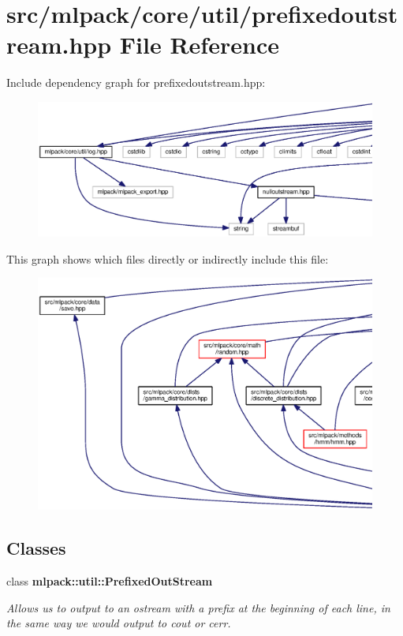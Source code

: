 \section{src/mlpack/core/util/prefixedoutstream.hpp File Reference}
\label{prefixedoutstream_8hpp}
Include dependency graph for prefixedoutstream.\+hpp\+:
\nopagebreak
\begin{figure}[H]
\begin{center}
\leavevmode
\includegraphics[width=350pt]{prefixedoutstream_8hpp__incl}
\end{center}
\end{figure}
This graph shows which files directly or indirectly include this file\+:
\nopagebreak
\begin{figure}[H]
\begin{center}
\leavevmode
\includegraphics[width=350pt]{prefixedoutstream_8hpp__dep__incl}
\end{center}
\end{figure}
\subsection*{Classes}
\begin{DoxyCompactItemize}
\item 
class {\bf mlpack\+::util\+::\+Prefixed\+Out\+Stream}
\begin{DoxyCompactList}\small\item\em Allows us to output to an ostream with a prefix at the beginning of each line, in the same way we would output to cout or cerr. \end{DoxyCompactList}\end{DoxyCompactItemize}
